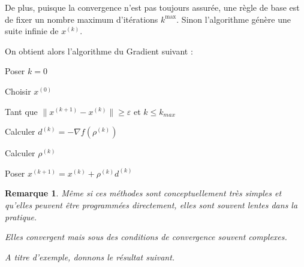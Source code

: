 \documentclass[12pt,a4paper,openay]{book}
\numberwithin{equation}{chapter}
\newtheorem{rmq}{Remarque}[chapter]
\newcommand{\dk}{d^{(k)}}
\newcommand{\xk}{x^{(k)}}
\newcommand{\xks}{x^{(k+1)}}
\newcommand{\rok}{\rho^{(k)}}
\newcommand{\gfk}{\nabla f(\rho^{(k)})}
\begin{document}
		De plus, puisque la convergence n'est pas toujours assur\'ee, une r\`egle de base est de fixer un nombre maximum d'it\'erations $k^{\max }$. Sinon l'algorithme g\'en\`ere une suite infinie de $x^{(k)}$.
		
		On obtient alors l'algorithme du Gradient suivant :
		
		Poser $k=0$
		
		Choisir $x^{(0)}$
		
		Tant que $\|\xks -\xk\|\geq \varepsilon$ et $k\leq k_{max}$
		
		Calculer $\dk =-\gfk$
		
		Calculer $\rok$
		
		Poser $\xks =\xk +\rok \dk$
		
			
		
		\begin{rmq}
			M\^eme si ces m\'ethodes sont conceptuellement tr\`es simples et qu'elles peuvent \^etre programm\'ees directement, elles sont souvent lentes dans la pratique.
			
			Elles convergent mais sous des conditions de convergence souvent complexes.
			
			A titre d'exemple, donnons le r\'esultat suivant.
		\end{rmq}
\end{document}
